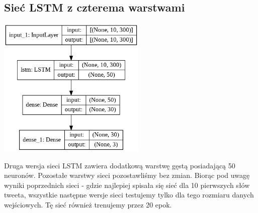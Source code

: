 \documentclass[11pt, a4paper, notitlepage]{report}
\begin{document}
\subsection{Sieć LSTM z czterema warstwami}
\begin{center}
\includegraphics[width=200pt]{graphics/model_LSTM_4_warstwy_10.png}
\end{center}
Druga wersja sieci LSTM zawiera dodatkową warstwę gęstą posiadającą 50 neuronów. Pozostałe warstwy sieci pozostawliśmy bez zmian. Biorąc pod uwagę wyniki poprzednich sieci - gdzie najlepiej spisała się sieć dla 10 pierwszych słów tweeta, wszystkie następne wersje sieci testujemy tylko dla tego rozmiaru danych wejściowych. Tę sieć również trenujemy przez 20 epok.
\end{document}
